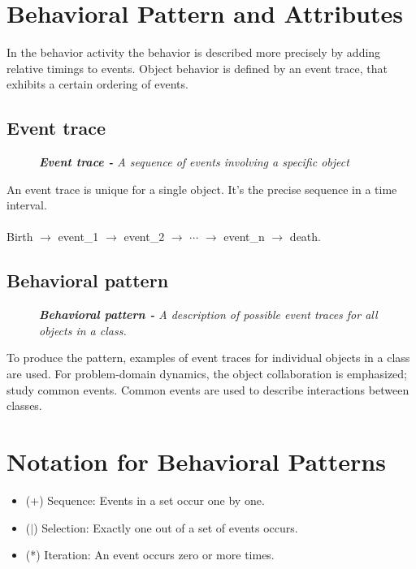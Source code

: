 \section{Behavioral Pattern and Attributes}
In the behavior activity the behavior is described more precisely by adding relative timings to events. Object behavior is defined by an event trace, that exhibits a certain ordering of events.

\subsection*{Event trace \ooad[92]}
\begin{figure}[H]
    \textit{\textbf{Event trace -} A sequence of events involving a specific object}
\end{figure}

An event trace is unique for a single object. It's the precise sequence in a time interval.\\
\\
Birth $\rightarrow$ event\_1 $\rightarrow$ event\_2 $\rightarrow$ $\cdots$ $\rightarrow$ event\_n $\rightarrow$ death.

\subsection*{Behavioral pattern \ooad[92]}
\begin{figure}[H]
    \textit{\textbf{Behavioral pattern -} A description of possible event traces for all objects in a class.}
\end{figure}
To produce the pattern, examples of event traces for individual objects in a class are used. For problem-domain dynamics, the object collaboration is emphasized; study common events. Common events are used to describe interactions between classes.

\section{Notation for Behavioral Patterns}
\begin{itemize}
    \item (+) Sequence: Events in a set occur one by one.
    \item ($\vert$) Selection: Exactly one out of a set of events occurs.
    \item (*) Iteration: An event occurs zero or more times.
\end{itemize}

